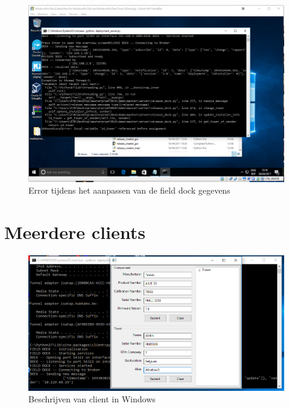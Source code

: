 \begin{figure}
\centering
\includegraphics[width=\textwidth,height=\textheight,keepaspectratio]{afbeelding/testMultiServer/installatie.png}
\caption{Error tijdens het aanpassen van de field dock gegevens}
\label{fig:testServer:installation}
\end{figure}

\clearpage
\section{Meerdere clients}\label{sec:multiclientscreen}
\begin{figure}
\centering
\includegraphics[width=\textwidth,height=\textheight,keepaspectratio]{afbeelding/testMultiClient/TorenBeschrijvenWindows.png}
\caption{Beschrijven van client in Windows}
\label{fig:testClient:windowsBeschrijving}
\end{figure}

